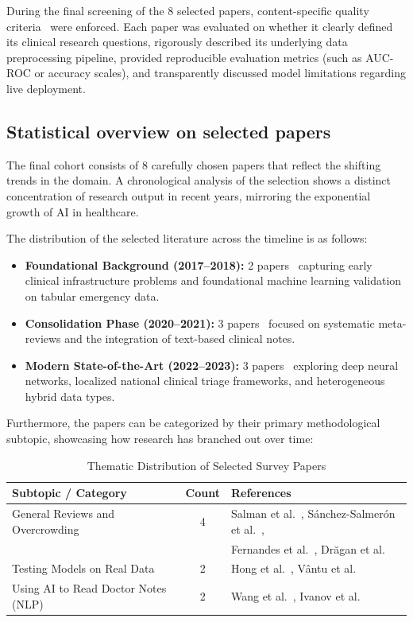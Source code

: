 \documentclass{article}
\begin{document}
During the final screening of the 8 selected papers, content-specific quality criteria~\cite{Rivera2022} were enforced. Each paper was evaluated on whether it clearly defined its clinical research questions, rigorously described its underlying data preprocessing pipeline, provided reproducible evaluation metrics (such as AUC-ROC or accuracy scales), and transparently discussed model limitations regarding live deployment.

\subsection{Statistical overview on selected papers}

The final cohort consists of 8 carefully chosen papers that reflect the shifting trends in the domain. A chronological analysis of the selection shows a distinct concentration of research output in recent years, mirroring the exponential growth of AI in healthcare. 

The distribution of the selected literature across the timeline is as follows:
\begin{itemize}
    \item \textbf{Foundational Background (2017--2018):} 2 papers~\cite{Dragan, Hong2018PredictingHA} capturing early clinical infrastructure problems and foundational machine learning validation on tabular emergency data.
    \item \textbf{Consolidation Phase (2020--2021):} 3 papers~\cite{FernandesReview, Salman2021, Ivanov2021} focused on systematic meta-reviews and the integration of text-based clinical notes.
    \item \textbf{Modern State-of-the-Art (2022--2023):} 3 papers~\cite{Sanchez2022, Vantu2023, Wang2023} exploring deep neural networks, localized national clinical triage frameworks, and heterogeneous hybrid data types.
\end{itemize}

Furthermore, the papers can be categorized by their primary methodological subtopic, showcasing how research has branched out over time:

\begin{table}[ht]
\centering
\caption{Thematic Distribution of Selected Survey Papers}
\label{tab:thematic_distribution}
\begin{tabular}{|l|c|l|}
\hline
\textbf{Subtopic / Category} & \textbf{Count} & \textbf{References} \\ \hline
General Reviews and Overcrowding & 4 & Salman et al.~\cite{Salman2021}, Sánchez-Salmerón et al.~\cite{Sanchez2022}, \\ 
 & & Fernandes et al.~\cite{FernandesReview}, Drăgan et al.~\cite{Dragan} \\ \hline
Testing Models on Real Data & 2 & Hong et al.~\cite{Hong2018PredictingHA}, Vântu et al.~\cite{Vantu2023} \\ \hline
Using AI to Read Doctor Notes (NLP) & 2 & Wang et al.~\cite{Wang2023}, Ivanov et al.~\cite{Ivanov2021} \\ \hline
\end{tabular}
\end{table}
\end{document}

